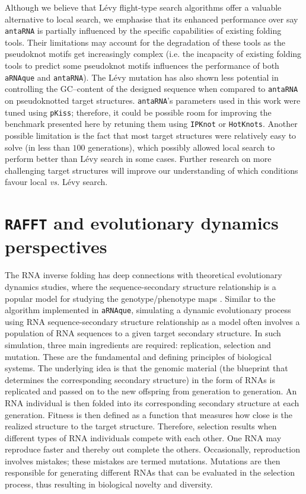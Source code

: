 Although we believe that Lévy flight-type search algorithms offer a valuable alternative to local search, we emphasise that its enhanced performance over say \texttt{antaRNA} is partially influenced by the specific capabilities of existing folding tools. Their limitations may account for the degradation of these tools as the pseudoknot motifs get increasingly complex (i.e. the incapacity of existing folding tools to predict some pseudoknot motifs influences the performance of both \texttt{aRNAque} and \texttt{antaRNA}). The Lévy mutation has also shown less potential in controlling the GC--content of the designed sequence when compared to \texttt{antaRNA} on pseudoknotted target structures. \texttt{antaRNA}'s parameters used in this work were tuned using \texttt{pKiss}; therefore, it could be possible room for improving the benchmark presented here by retuning them using \texttt{IPKnot} or \texttt{HotKnots}.  Another possible limitation is the fact that most target structures were relatively easy to solve (in less than $100$ generations), which possibly allowed local search to perform better than Lévy search in some cases. Further research on more challenging target structures will improve our understanding of which conditions favour local \emph{vs.} Lévy search.


\section{\texttt{RAFFT} and evolutionary dynamics perspectives}
The RNA inverse folding has deep connections with theoretical evolutionary dynamics studies, where the sequence-secondary structure relationship is a popular model for studying the genotype/phenotype maps \cite{greenbury2016genetic,jaeger2001tectorna}. Similar to the algorithm implemented in \texttt{aRNAque}, simulating a dynamic evolutionary process using RNA sequence-secondary structure relationship as a model often involves a population of RNA sequences to a given target secondary structure. In such simulation, three main ingredients are required: replication, selection and mutation. These are the fundamental and defining principles of biological systems. The underlying idea is that the genomic material (the blueprint that determines the corresponding secondary structure) in the form of RNAs is replicated and passed on to the new offspring from generation to generation. An RNA individual is then folded into its corresponding secondary structure at each generation. Fitness is then defined as a function that measures how close is the realized structure to the target structure. Therefore, selection results when different types of RNA individuals compete with each other. One RNA may reproduce faster and thereby out complete the others. Occasionally, reproduction involves mistakes; these mistakes are termed mutations. Mutations are then responsible for generating different RNAs that can be evaluated in the selection process, thus resulting in biological novelty and diversity. 

